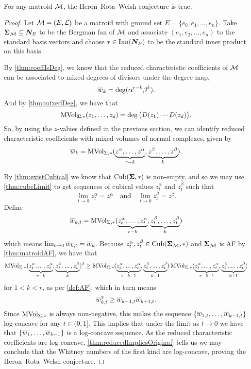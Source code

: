 \documentclass[12pt,oneside]{../../sfsuthesis}
\begin{document}
\begin{Result}
    For any matroid \( \mathcal{M} \), the Heron--Rota--Welsh conjecture is true.
\end{Result}
\begin{proof}
    Let \( \mathcal{M} = (E, \mathcal{L}) \) be a matroid with ground set \( E = \{ e_0, e_1, \dots, e_n \} \).
    Take \( {\bm{\Sigma}}_{\mathcal{M}} \subseteq \bm{N}_E \) to be the Bergman fan of \( \mathcal{M} \) and associate \( (e_1, e_2, \dots, e_n) \) to the standard basis vectors and choose \( \ast \in \operatorname{Inn}(\bm{N}_E) \) to be the standard inner product on this basis.

    By \th\ref{thm:coeffIsDeg}, we know that the reduced characteristic coefficients of \( \mathcal{M} \) can be associated to mixed degrees of divisors under the degree map,
    \[
        \overline{w}_k = \deg(\alpha^{r-k}\beta^k).
    \]
    And by \th\ref{thm:mixedDeg}, we have that
    \[
        \operatorname{MVol}_{{\bm{\Sigma}}, \ast}(z_1, \dots, z_d) = \deg\big( D(z_1) \cdots D(z_d) \big).
    \]
    So, by using the \( z \)-values defined in the previous section, we can identify reduced characteristic coefficients with mixed volumes of normal complexes, given by
    \[
        \overline{w}_k = \operatorname{MVol}_{\Sigma, \ast}(\underbrace{z^\alpha,\ldots,z^\alpha}_{r-k},\underbrace{z^\beta,\ldots,z^\beta}_{k}).
    \]

    By \th\ref{thm:existCubical} we know that \( \operatorname{Cub}({\bm{\Sigma}}, \ast) \) is non-empty, and so we may use \th\ref{thm:cubeLimit} to get sequences of cubical values \( z_t^\alpha \) and \( z_t^\beta \) such that
    \[
        \lim_{t \to 0 } z_t^\alpha = z^\alpha \quad \text{and} \quad  \lim_{t \to 0 } z_t^\beta = z^\beta.
    \]
    Define
    \[
        \overline{w}_{k,t} = \operatorname{MVol}_{\Sigma, \ast}(\underbrace{z_t^\alpha,\ldots,z_t^\alpha}_{r-k},\underbrace{z_t^\beta,\ldots,z_t^\beta}_{k})
    \]
    which means \( \lim_{t \to 0} \overline{w}_{k,t} = \overline{w}_k \).
    Because \( z_t^\alpha, z_t^\beta \in \operatorname{Cub}({\bm{\Sigma}}_{\mathcal{M}}, \ast) \) and \( {\bm{\Sigma}}_{\mathcal{M}} \) is AF by \th\ref{thm:matroidAF}, we have that
    \[
        \MVol_{\Sigma, \ast}(\underbrace{z_t^\alpha,\mydots,z_t^\alpha}_{r-k},\underbrace{z_t^\beta,\mydots,z_t^\beta}_{k})^2
        \geq
        \MVol_{\Sigma, \ast}(\underbrace{z_t^\alpha,\mydots,z_t^\alpha}_{r-k-1},\underbrace{z_t^\beta,\mydots,z_t^\beta}_{k-1})
        \MVol_{\Sigma, \ast}(\underbrace{z_t^\alpha,\mydots,z_t^\alpha}_{r-k+1},\underbrace{z_t^\beta,\mydots,z_t^\beta}_{k+1})
    \]
    for \( 1 < k < r \), as per \th\ref{def:AF}, which in turn means
    \[
        \overline{w}_{k,t}^2 \geq \overline{w}_{k-1,t}\overline{w}_{k+1,t}.
    \]
    Since \( \operatorname{MVol}_{\Sigma, \ast} \) is always non-negative, this makes the sequence \( \{ \overline{w}_{1,t}, \dots, \overline{w}_{k-1,t}  \} \) log-concave for any \( t \in (0,1] \).
    This implies that under the limit as \( t \to 0 \) we have that \( \{ \overline{w}_{1}, \dots, \overline{w}_{k-1} \} \) is a log-concave sequence.
    As the reduced characteristic coefficients are log-concave, \th\ref{thm:reducedImpliesOriginal} tells us we may conclude that the Whitney numbers of the first kind are log-concave, proving the Heron--Rota--Welsh conjecture.
\end{proof}
\end{document}
